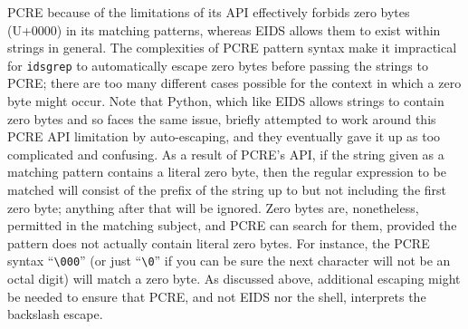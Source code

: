 \documentclass[twocolumn]{report}
\begin{document}
PCRE because of the limitations of its API effectively forbids zero
bytes (U+0000) in its matching patterns, whereas EIDS allows them to
exist within strings in general.  The complexities of PCRE pattern
syntax make it impractical for \texttt{idsgrep} to automatically
escape zero bytes before passing the strings to PCRE; there are too
many different cases possible for the context in which a zero byte
might occur.  Note that Python, which like EIDS allows strings to
contain zero bytes and so faces the same issue, briefly attempted to
work around this PCRE API limitation by auto-escaping, and they
eventually gave it up as too complicated and confusing.  As a result
of PCRE's API, if the string given as a matching pattern contains a
literal zero byte, then the regular expression to be matched will
consist of the prefix of the string up to but not including the first
zero byte; anything after that will be ignored. Zero bytes are,
nonetheless, permitted in the matching subject, and PCRE can search
for them, provided the pattern does not actually contain literal zero
bytes. For instance, the PCRE syntax ``\texttt{\textbackslash000}''
(or just ``\texttt{\textbackslash0}'' if you can be sure the next
character will not be an octal digit) will match a zero byte.  As
discussed above, additional escaping might be needed to ensure that
PCRE, and not EIDS nor the shell, interprets the backslash escape.


\clearpage
{}



\end{document}
